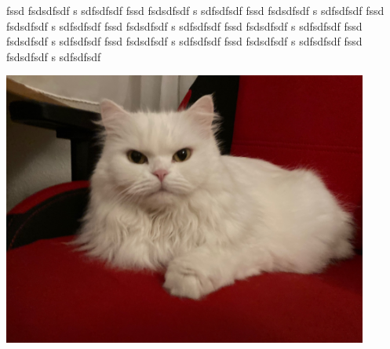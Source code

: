 \documentclass[12pt,ngerman,parskip=half]{scrreprt}
\begin{document}
\blindtext[2] fssd fsdsdfsdf s sdfsdfsdf fssd fsdsdfsdf s sdfsdfsdf fssd fsdsdfsdf s sdfsdfsdf fssd fsdsdfsdf s sdfsdfsdf fssd fsdsdfsdf s sdfsdfsdf fssd fsdsdfsdf s sdfsdfsdf fssd fsdsdfsdf s sdfsdfsdf fssd fsdsdfsdf s sdfsdfsdf fssd fsdsdfsdf s sdfsdfsdf fssd fsdsdfsdf s sdfsdfsdf 


\begin{minipage}{\textwidth}
\begin{center}
\includegraphics[width=0.9\textwidth]{./Bilder/Katze.jpg} %
\end{center}
\end{minipage}
\end{document}

